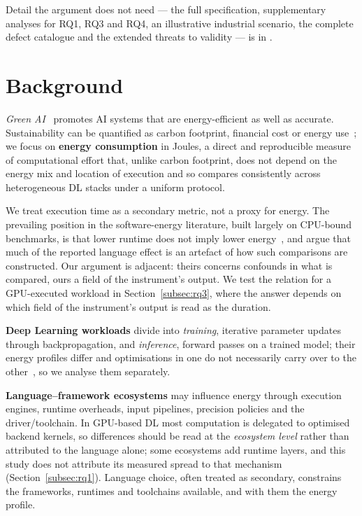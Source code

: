 Detail the argument does not need --- the full specification, supplementary analyses for RQ1, RQ3 and RQ4, an illustrative industrial scenario, the complete defect catalogue and the extended threats to validity --- is in \ESMname.

\section{Background}
\label{sec:background}

\emph{Green AI}~\citep{schwartz2020green,verdecchia2023systematic,cruz2025greening}
promotes AI systems that are energy-efficient as well as accurate.
Sustainability can be quantified as carbon footprint, financial cost or energy
use~\citep{kaack2022aligning,patterson2021carbon}; we focus on \textbf{energy
consumption} in Joules, a direct and reproducible measure of computational
effort that, unlike carbon footprint, does not depend on the energy mix and
location of execution and so compares consistently across heterogeneous DL
stacks under a uniform protocol.

We treat execution time as a secondary metric, not a proxy for energy. The
prevailing position in the software-energy literature, built largely on
CPU-bound benchmarks, is that lower runtime does not imply lower
energy~\citep{weber2023twins,rua2024large,pereira2021ranking}, and 
\citet{vankempen2025green} argue that much of the reported language effect
is an artefact of how such comparisons are constructed. Our argument is
adjacent: theirs concerns confounds in what is compared, ours a field of the
instrument's output. We test the relation for a GPU-executed workload in
Section~\ref{subsec:rq3}, where the answer depends on which field of the
instrument's output is read as the duration.

\textbf{Deep Learning workloads} divide into \emph{training}, iterative
parameter updates through backpropagation, and \emph{inference}, forward passes
on a trained model; their energy profiles differ and optimisations in one do
not necessarily carry over to the other~\citep{mehlin2023towards,tripp2024measuring},
so we analyse them separately.

\textbf{Language--framework ecosystems} may influence energy through execution
engines, runtime overheads, input pipelines, precision policies and the
driver/toolchain. In GPU-based DL most computation is delegated to optimised
backend kernels, so differences should be read at the \emph{ecosystem level}
rather than attributed to the language alone; some ecosystems add runtime
layers, and this study does not attribute its measured spread to that mechanism
(Section~\ref{subsec:rq1}). Language choice, often treated as secondary,
constrains the frameworks, runtimes and toolchains available, and with them the
energy profile.

